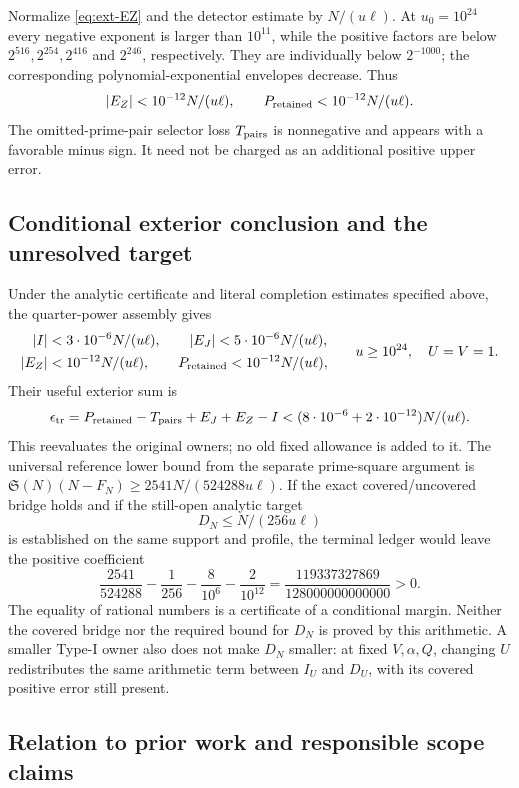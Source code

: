 \documentclass[11pt,a4paper]{article}
\theoremstyle{definition}
\theoremstyle{remark}
\begin{document}
Normalize \eqref{eq:ext-EZ} and the detector estimate by $N/(u\ell)$.
At $u_0=10^{24}$ every negative exponent is larger than $10^{11}$,
while the positive factors are below $2^{516},2^{254},2^{416}$ and
$2^{246}$, respectively. They are individually below $2^{-1000}$;
the corresponding polynomial-exponential envelopes decrease.
Thus
\[
 |E_Z|<10^{-12}N/(u\ell),\qquad
 P_{\rm retained}<10^{-12}N/(u\ell).
\]
The omitted-prime-pair selector loss $T_{\rm pairs}$ is nonnegative
and appears with a favorable minus sign. It need not be charged as
an additional positive upper error.

\subsection{Conditional exterior conclusion and the unresolved target}

Under the analytic certificate and literal completion estimates
specified above, the quarter-power assembly gives
\begin{equation}\label{eq:ext-final}
 \begin{split}
 |I|&<3\cdot10^{-6}N/(u\ell),\qquad
 |E_J|<5\cdot10^{-6}N/(u\ell),\\
 |E_Z|&<10^{-12}N/(u\ell),\qquad
 P_{\rm retained}<10^{-12}N/(u\ell),
 \end{split}\qquad u\geq10^{24},\quad U=V=1.
\end{equation}
Their useful exterior sum is
\[
 \epsilon_{\rm tr}=P_{\rm retained}-T_{\rm pairs}+E_J+E_Z-I
   <(8\cdot10^{-6}+2\cdot10^{-12})N/(u\ell).
\]
This reevaluates the original owners; no old fixed allowance is added
to it. The universal reference lower bound from the separate prime-square
argument is
$\mathfrak S(N)(N-F_N)\geq2541N/(524288u\ell)$.
If the exact covered/uncovered bridge holds and if the still-open
analytic target
\[
             D_N\leq N/(256u\ell)
\]
is established on the same support and profile, the terminal ledger
would leave the positive coefficient
\[
 \frac{2541}{524288}-\frac1{256}
                  -\frac8{10^6}-\frac2{10^{12}}
       =\frac{119337327869}{128000000000000}>0.
\]
The equality of rational numbers is a certificate of a conditional
margin. Neither the covered bridge nor the required bound for $D_N$
is proved by this arithmetic. A smaller Type-I owner also does not
make $D_N$ smaller: at fixed $V,\alpha,Q$, changing $U$ redistributes
the same arithmetic term between $I_U$ and $D_U$, with its covered
positive error still present.

\subsection{Relation to prior work and responsible scope claims}
\end{document}
